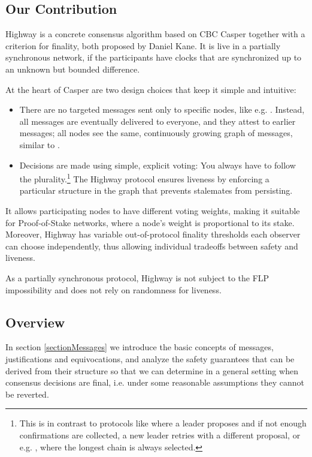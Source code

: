 \documentclass[12pt]{article}
\begin{document}
\subsection*{Our Contribution}

Highway is a concrete consensus algorithm based on CBC Casper \cite{zamfir2018casper} together with a criterion for finality, both proposed by Daniel Kane. It is live in a partially synchronous network, if the participants have clocks that are synchronized up to an unknown but bounded difference.

At the heart of Casper are two design choices that keep it simple and intuitive:
\begin{itemize}
  \item There are no targeted messages sent only to specific nodes, like e.g. \cite{miller2016honey}. Instead, all messages are eventually delivered to everyone, and they attest to earlier messages; all nodes see the same, continuously growing graph of messages, similar to \cite{baird2016hashgraph,chevalier2018parsec,gkagol2019aleph,moser1999byzantine}.
  \item Decisions are made using simple, explicit voting: You always have to follow the plurality.\footnote{This is in contrast to protocols like \cite{buchman2018latest,castro1999practical,muratov2018yac} where a leader proposes and if not enough confirmations are collected, a new leader retries with a different proposal, or e.g. \cite{kiayias2017ouroboros}, where the longest chain is always selected.} The Highway protocol ensures liveness by enforcing a particular structure in the graph that prevents stalemates from persisting.
\end{itemize}

It allows participating nodes to have different voting weights, making it suitable for Proof-of-Stake networks, where a node's weight is proportional to its stake. Moreover, Highway has variable out-of-protocol finality thresholds each observer can choose independently, thus allowing individual tradeoffs between safety and liveness.

As a partially synchronous protocol, Highway is not subject to the FLP impossibility \cite{fischer1982impossibility} and does not rely on randomness for liveness.


\subsection*{Overview}

In section \ref{sectionMessages} we introduce the basic concepts of messages, justifications and equivocations, and analyze the safety guarantees that can be derived from their structure so that we can determine in a general setting when consensus decisions are final, i.e. under some reasonable assumptions they cannot be reverted.
\end{document}
